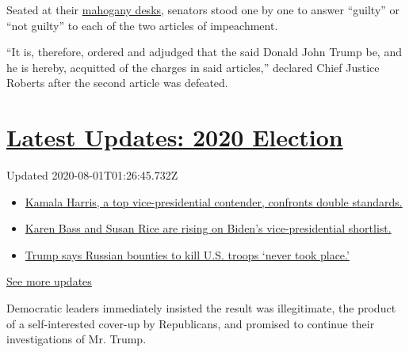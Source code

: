 Seated at their
\href{https://www.nytimes.com/2020/01/17/us/politics/senate-impeachment-trial-furniture.html}{mahogany
desks}, senators stood one by one to answer ``guilty'' or ``not guilty''
to each of the two articles of impeachment.

``It is, therefore, ordered and adjudged that the said Donald John Trump
be, and he is hereby, acquitted of the charges in said articles,''
declared Chief Justice Roberts after the second article was defeated.

\hypertarget{latest-updates-2020-election}{%
\section{\texorpdfstring{\href{https://www.nytimes.com/2020/07/31/us/elections/biden-vs-trump.html?action=click\&pgtype=Article\&state=default\&region=MAIN_CONTENT_1\&context=storylines_live_updates}{Latest
Updates: 2020
Election}}{Latest Updates: 2020 Election}}\label{latest-updates-2020-election}}

Updated 2020-08-01T01:26:45.732Z

\begin{itemize}
\tightlist
\item
  \href{https://www.nytimes.com/2020/07/31/us/elections/biden-vs-trump.html?action=click\&pgtype=Article\&state=default\&region=MAIN_CONTENT_1\&context=storylines_live_updates\#link-29fdff45}{Kamala
  Harris, a top vice-presidential contender, confronts double
  standards.}
\item
  \href{https://www.nytimes.com/2020/07/31/us/elections/biden-vs-trump.html?action=click\&pgtype=Article\&state=default\&region=MAIN_CONTENT_1\&context=storylines_live_updates\#link-13ec3d9c}{Karen
  Bass and Susan Rice are rising on Biden's vice-presidential
  shortlist.}
\item
  \href{https://www.nytimes.com/2020/07/31/us/elections/biden-vs-trump.html?action=click\&pgtype=Article\&state=default\&region=MAIN_CONTENT_1\&context=storylines_live_updates\#link-49e9a016}{Trump
  says Russian bounties to kill U.S. troops `never took place.'}
\end{itemize}

\href{https://www.nytimes.com/2020/07/31/us/elections/biden-vs-trump.html?action=click\&pgtype=Article\&state=default\&region=MAIN_CONTENT_1\&context=storylines_live_updates}{See
more updates}

Democratic leaders immediately insisted the result was illegitimate, the
product of a self-interested cover-up by Republicans, and promised to
continue their investigations of Mr. Trump.

